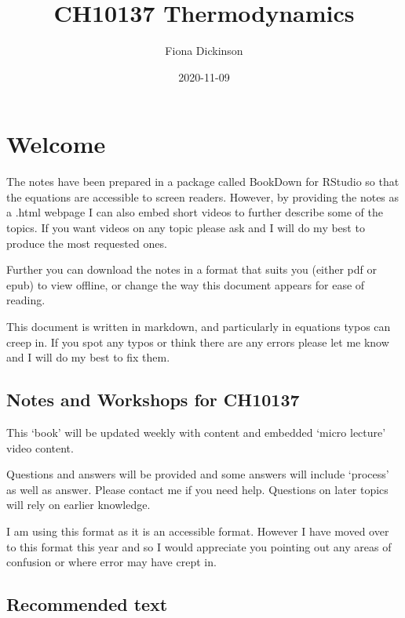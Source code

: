 \documentclass[
]{book}
\title{CH10137 Thermodynamics}
\author{Fiona Dickinson}
\date{2020-11-09}
\begin{document}
\maketitle

{
\setcounter{tocdepth}{1}
\tableofcontents
}
\hypertarget{welcome}{%
\chapter*{Welcome}\label{welcome}}

The notes have been prepared in a package called BookDown for RStudio so that the equations are accessible to screen readers. However, by providing the notes as a .html webpage I can also embed short videos to further describe some of the topics. If you want videos on any topic please ask and I will do my best to produce the most requested ones.

Further you can download the notes in a format that suits you (either pdf or epub) to view offline, or change the way this document appears for ease of reading.

This document is written in markdown, and particularly in equations typos can creep in. If you spot any typos or think there are any errors please let me know and I will do my best to fix them.

\hypertarget{notes-and-workshops-for-ch10137}{%
\section*{Notes and Workshops for CH10137}\label{notes-and-workshops-for-ch10137}}

This `book' will be updated weekly with content and embedded `micro lecture' video content.

Questions and answers will be provided and some answers will include `process' as well as answer. Please contact me if you need help. Questions on later topics will rely on earlier knowledge.

I am using this format as it is an accessible format. However I have moved over to this format this year and so I would appreciate you pointing out any areas of confusion or where error may have crept in.

\hypertarget{recommended-text}{%
\section*{Recommended text}\label{recommended-text}}
\end{document}
